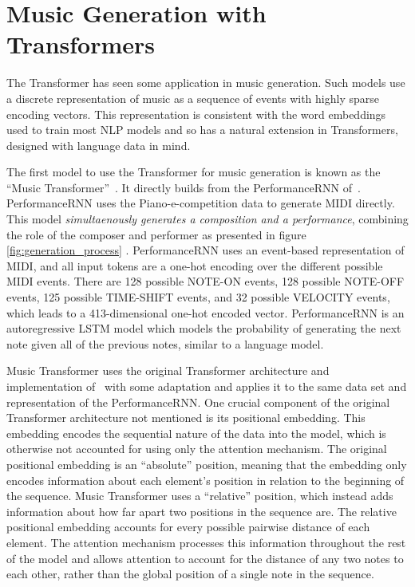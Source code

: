 
\section{Music Generation with Transformers}
The Transformer has seen some application in music generation. Such models use a discrete representation of music as a sequence of events with highly sparse encoding vectors. This representation is consistent with the word embeddings used to train most NLP models and so has a natural extension in Transformers, designed with language data in mind. 

The first model to use the Transformer for music generation is known as the ``Music Transformer''~\cite{huang2018music}. It directly builds from the PerformanceRNN of~\citet{oore2020time}. PerformanceRNN uses the Piano-e-competition data to generate MIDI directly. This model \emph{simultaenously generates a composition and a performance}, combining the role of the composer and performer as presented in figure \ref{fig:generation_process} . PerformanceRNN uses an event-based representation of MIDI, and all input tokens are a one-hot encoding over the different possible MIDI events. There are 128 possible NOTE-ON events, 128 possible NOTE-OFF events, 125 possible TIME-SHIFT events, and 32 possible VELOCITY events, which leads to a 413-dimensional one-hot encoded vector. PerformanceRNN is an autoregressive LSTM model which models the probability of generating the next note given all of the previous notes, similar to a language model. 

Music Transformer uses the original Transformer architecture and implementation of~\citet{vaswani2017attention} with some adaptation and applies it to the same data set and representation of the PerformanceRNN. One crucial component of the original Transformer architecture not mentioned is its positional embedding. This embedding encodes the sequential nature of the data into the model, which is otherwise not accounted for using only the attention mechanism. The original positional embedding is an ``absolute'' position, meaning that the embedding only encodes information about each element's position in relation to the beginning of the sequence. Music Transformer uses a ``relative'' position, which instead adds information about how far apart two positions in the sequence are. The relative positional embedding accounts for every possible pairwise distance of each element. The attention mechanism processes this information throughout the rest of the model and allows attention to account for the distance of any two notes to each other, rather than the global position of a single note in the sequence. 

